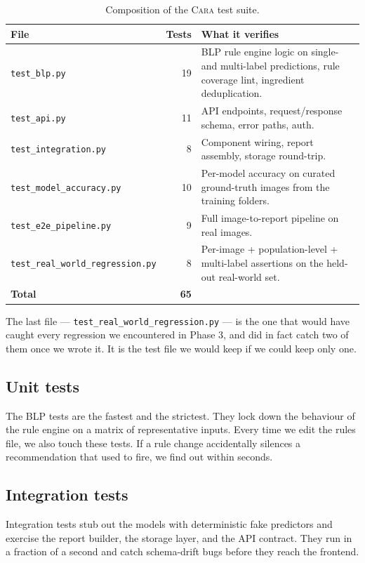 \documentclass[11pt,a4paper,oneside]{report}
\newcommand{\cara}{\textsc{Cara}\xspace}
\begin{document}
\begin{table}[htbp]
    \centering
    \caption{Composition of the \cara test suite.}
    \label{tab:tests}
    \small
    \begin{tabular}{lrp{7.2cm}}
        \toprule
        \textbf{File} & \textbf{Tests} & \textbf{What it verifies} \\
        \midrule
        \texttt{test\_blp.py}                 & 19 & BLP rule engine logic on single- and multi-label predictions, rule coverage lint, ingredient deduplication. \\
        \texttt{test\_api.py}                 & 11 & API endpoints, request/response schema, error paths, auth. \\
        \texttt{test\_integration.py}         &  8 & Component wiring, report assembly, storage round-trip. \\
        \texttt{test\_model\_accuracy.py}     & 10 & Per-model accuracy on curated ground-truth images from the training folders. \\
        \texttt{test\_e2e\_pipeline.py}       &  9 & Full image-to-report pipeline on real images. \\
        \texttt{test\_real\_world\_regression.py} & 8 & Per-image + population-level + multi-label assertions on the held-out real-world set. \\
        \midrule
        \textbf{Total}                        & \textbf{65} & \\
        \bottomrule
    \end{tabular}
\end{table}

The last file --- \texttt{test\_real\_world\_regression.py} --- is
the one that would have caught every regression we encountered in
Phase 3, and did in fact catch two of them once we wrote it. It is
the test file we would keep if we could keep only one.

\subsection{Unit tests}
The BLP tests are the fastest and the strictest. They lock down
the behaviour of the rule engine on a matrix of representative
inputs. Every time we edit the rules file, we also touch these
tests. If a rule change accidentally silences a recommendation
that used to fire, we find out within seconds.

\subsection{Integration tests}
Integration tests stub out the models with deterministic fake
predictors and exercise the report builder, the storage layer, and
the API contract. They run in a fraction of a second and catch
schema-drift bugs before they reach the frontend.
\end{document}

